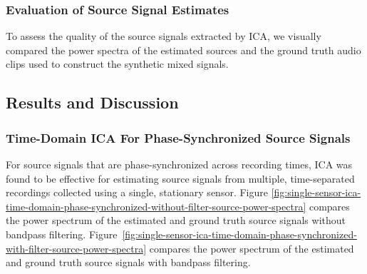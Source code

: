 \documentclass[10pt]{article}
\begin{document}
\subsubsection*{Evaluation of Source Signal Estimates}
To assess the quality of the source signals extracted by ICA, we visually compared the
power spectra of the estimated sources and the ground truth audio clips used to construct
the synthetic mixed signals.


\subsection*{Results and Discussion}

\subsubsection*{Time-Domain ICA For Phase-Synchronized Source Signals}
For source signals that are phase-synchronized across recording times, ICA was found to be
effective for estimating source signals from multiple, time-separated recordings collected
using a single, stationary sensor.
Figure \ref{fig:single-sensor-ica-time-domain-phase-synchronized-without-filter-source-power-spectra}
compares the power spectrum of the estimated and ground truth source signals
without bandpass filtering.
Figure~\ref{fig:single-sensor-ica-time-domain-phase-synchronized-with-filter-source-power-spectra}
compares the power spectrum of the estimated and ground truth source signals with bandpass
filtering.
\end{document}
